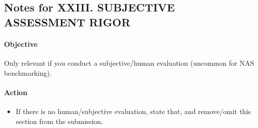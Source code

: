 \subsection*{Notes for XXIII. SUBJECTIVE ASSESSMENT RIGOR}
\paragraph{Objective}
Only relevant if you conduct a subjective/human evaluation (uncommon for NAS benchmarking).

\paragraph{Action}
\begin{itemize}
  \item If there is no human/subjective evaluation, state that, and remove/omit this section from the submission. %
\end{itemize}
